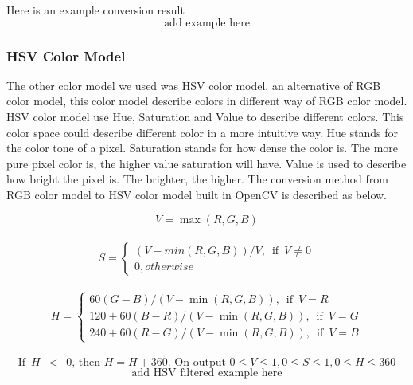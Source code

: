             Here is an example conversion result
            $$ \textrm{add example here} $$
        \subsubsection{HSV Color Model}
            The other color model we used was HSV color model, an alternative of RGB color model, this color model describe colors in different way of RGB color model.
            HSV color model use Hue, Saturation and Value to describe different colors.
            This color space could describe different color in a more intuitive way.
            Hue stands for the color tone of a pixel. %
            Saturation stands for how dense the color is. The more pure pixel color is, the higher value saturation will have.
            Value is used to describe how bright the pixel is. The brighter, the higher.
            The conversion method from RGB color model to HSV color model built in OpenCV is described as below.

            $$
                V = \max(R,G,B)
            $$\\
            $$
                S = 
                \begin{cases}
                    {{{(V-min(R,G,B))}/{V}}, \enspace\textrm{if}\enspace V \neq 0}\\
                    {0, otherwise}
                \end{cases}
            $$\\
            $$
                H =
                \begin{cases} 
                    {{60(G - B)}/{(V-\min(R,G,B))}, \enspace\textrm{if}\enspace V=R}\\
                    {{120+60(B - R)}/{(V-\min(R,G,B))}, \enspace\textrm{if}\enspace V=G}\\
                    {{240+60(R - G)}/{(V-\min(R,G,B))}, \enspace\textrm{if}\enspace V=B}
                \end{cases}
            $$\\   
            $$
                \textrm{If} \enspace H \enspace < \enspace 0 \textrm{, then } H = H + 360. \textrm{ On output } 0 \leq V \leq 1, 0 \leq S \leq 1, 0 \leq H \leq 360
            $$
            $$ \textrm{add HSV filtered example here} $$

